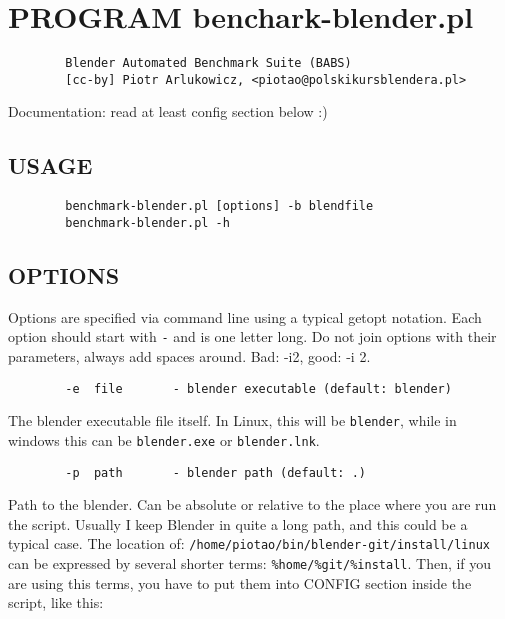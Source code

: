 \documentclass{article}
\begin{document}

\section{PROGRAM benchark-blender.pl\label{PROGRAM_benchark-blender_pl}}
\begin{verbatim}
        Blender Automated Benchmark Suite (BABS)
        [cc-by] Piotr Arlukowicz, <piotao@polskikursblendera.pl>
\end{verbatim}


Documentation: read at least config section below :)

\subsection*{USAGE\label{USAGE}}
\begin{verbatim}
        benchmark-blender.pl [options] -b blendfile
        benchmark-blender.pl -h
\end{verbatim}
\subsection*{OPTIONS\label{OPTIONS}}


Options are specified via command line using a typical getopt notation. Each
option should start with \texttt{-} and is one letter long. Do not join options with
their parameters, always add spaces around. Bad: -i2, good: -i 2.

\begin{verbatim}
        -e  file       - blender executable (default: blender)
\end{verbatim}


The blender executable file itself. In Linux, this will be \texttt{blender}, while in
windows this can be \texttt{blender.exe} or \texttt{blender.lnk}.

\begin{verbatim}
        -p  path       - blender path (default: .)
\end{verbatim}


Path to the blender. Can be absolute or relative to the place where you are
run the script. Usually I keep Blender in quite a long path, and this could
be a typical case. The location of: \texttt{/home/piotao/bin/blender-git/install/linux}
can be expressed by several shorter terms: \texttt{\%home/\%git/\%install}. Then, if
you are using this terms, you have to put them into CONFIG section inside the
script, like this:
\end{document}
